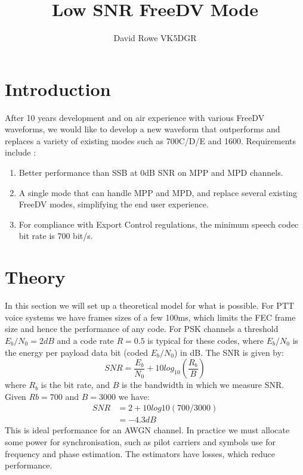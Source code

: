 \documentclass{article}
\begin{document}
\title{Low SNR FreeDV Mode}
\author{David Rowe VK5DGR}
\maketitle

\section{Introduction}

After 10 years development and on air experience with various FreeDV waveforms, we would like to develop a new waveform that outperforms and replaces a variety of existing modes such as 700C/D/E and 1600.  Requirements include \cite{freedv-020}:
\begin{enumerate}
\item Better performance than SSB at 0dB SNR on MPP and MPD channels.
\item A single mode that can handle MPP and MPD, and replace several existing FreeDV modes, simplifying the end user experience.
\item For compliance with Export Control regulations, the minimum speech codec bit rate is 700 bit/s.
\end{enumerate}

\section{Theory}

In this section we will set up a theoretical model for what is possible.  For PTT voice systems we have frames sizes of a few 100ms, which limits the FEC frame size and hence the performance of any code.  For PSK channels a threshold $E_b/N_0=2dB$ and a code rate $R=0.5$ is typical for these codes, where $E_b/N_0$ is the energy per payload data bit (coded $E_b/N_0$) in dB.  The SNR is given by:
\begin{equation}
SNR = \frac{E_b}{N_0} + 10log_{10}\left(\frac{R_b}{B}\right)
\end{equation}
where $R_b$ is the bit rate, and $B$ is the bandwidth in which we measure SNR.  Given $Rb=700$ and $B=3000$ we have:
\begin{equation}
\begin{split}
SNR &= 2 + 10log10(700/3000) \\
    &= -4.3 dB
\end{split}
\end{equation}
This is ideal performance for an AWGN channel.  In practice we must allocate some power for synchronisation, such as pilot carriers and symbols use for frequency and phase estimation.  The estimators have losses, which reduce performance.
\end{document}
